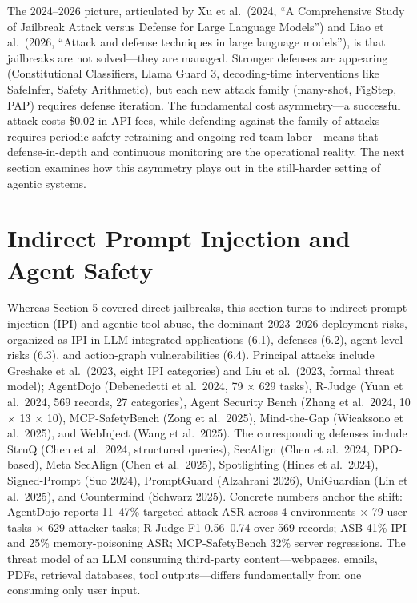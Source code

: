 The 2024--2026 picture, articulated by Xu et al.~(2024, ``A Comprehensive Study of Jailbreak Attack versus Defense for Large Language Models'') and Liao et al.~(2026, ``Attack and defense techniques in large language models''), is that jailbreaks are not solved---they are managed. Stronger defenses are appearing (Constitutional Classifiers, Llama Guard 3, decoding-time interventions like SafeInfer, Safety Arithmetic), but each new attack family (many-shot, FigStep, PAP) requires defense iteration. The fundamental cost asymmetry---a successful attack costs \$0.02 in API fees, while defending against the family of attacks requires periodic safety retraining and ongoing red-team labor---means that defense-in-depth and continuous monitoring are the operational reality. The next section examines how this asymmetry plays out in the still-harder setting of agentic systems.

\section{Indirect Prompt Injection and Agent Safety}\label{indirect-prompt-injection-and-agent-safety}

Whereas Section 5 covered direct jailbreaks, this section turns to indirect prompt injection (IPI) and agentic tool abuse, the dominant 2023--2026 deployment risks, organized as IPI in LLM-integrated applications (6.1), defenses (6.2), agent-level risks (6.3), and action-graph vulnerabilities (6.4). Principal attacks include Greshake et al.~(2023, eight IPI categories) and Liu et al.~(2023, formal threat model); AgentDojo (Debenedetti et al.~2024, 79 × 629 tasks), R-Judge (Yuan et al.~2024, 569 records, 27 categories), Agent Security Bench (Zhang et al.~2024, 10 × 13 × 10), MCP-SafetyBench (Zong et al.~2025), Mind-the-Gap (Wicaksono et al.~2025), and WebInject (Wang et al.~2025). The corresponding defenses include StruQ (Chen et al.~2024, structured queries), SecAlign (Chen et al.~2024, DPO-based), Meta SecAlign (Chen et al.~2025), Spotlighting (Hines et al.~2024), Signed-Prompt (Suo 2024), PromptGuard (Alzahrani 2026), UniGuardian (Lin et al.~2025), and Countermind (Schwarz 2025). Concrete numbers anchor the shift: AgentDojo reports 11--47\% targeted-attack ASR across 4 environments × 79 user tasks × 629 attacker tasks; R-Judge F1 0.56--0.74 over 569 records; ASB 41\% IPI and 25\% memory-poisoning ASR; MCP-SafetyBench 32\% server regressions. The threat model of an LLM consuming third-party content---webpages, emails, PDFs, retrieval databases, tool outputs---differs fundamentally from one consuming only user input.

